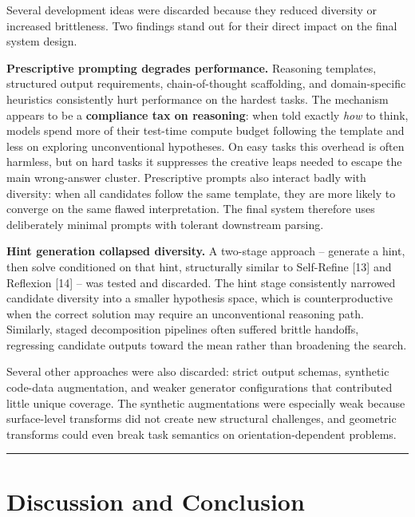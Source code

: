 \documentclass[conference]{IEEEtran}
\begin{document}
Several development ideas were discarded because they reduced diversity
or increased brittleness. Two findings stand out for their direct impact
on the final system design.

\textbf{Prescriptive prompting degrades performance.} Reasoning
templates, structured output requirements, chain-of-thought scaffolding,
and domain-specific heuristics consistently hurt performance on the
hardest tasks. The mechanism appears to be a \textbf{compliance tax on
reasoning}: when told exactly \emph{how} to think, models spend more of
their test-time compute budget following the template and less on
exploring unconventional hypotheses. On easy tasks this overhead is
often harmless, but on hard tasks it suppresses the creative leaps
needed to escape the main wrong-answer cluster. Prescriptive prompts
also interact badly with diversity: when all candidates follow the same
template, they are more likely to converge on the same flawed
interpretation. The final system therefore uses deliberately minimal
prompts with tolerant downstream parsing.

\textbf{Hint generation collapsed diversity.} A two-stage approach --
generate a hint, then solve conditioned on that hint, structurally
similar to Self-Refine {[}13{]} and Reflexion {[}14{]} -- was tested and
discarded. The hint stage consistently narrowed candidate diversity into
a smaller hypothesis space, which is counterproductive when the correct
solution may require an unconventional reasoning path. Similarly, staged
decomposition pipelines often suffered brittle handoffs, regressing
candidate outputs toward the mean rather than broadening the search.

Several other approaches were also discarded: strict output schemas,
synthetic code-data augmentation, and weaker generator configurations
that contributed little unique coverage. The synthetic augmentations
were especially weak because surface-level transforms did not create new
structural challenges, and geometric transforms could even break task
semantics on orientation-dependent problems.

\begin{center}\rule{0.5\linewidth}{0.5pt}\end{center}

\section{Discussion and Conclusion}\label{discussion-and-conclusion}
\end{document}

